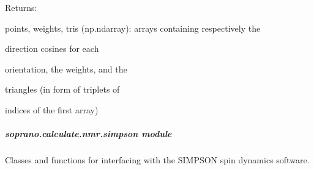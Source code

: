 \documentclass[letterpaper,10pt,english]{sphinxmanual}
\begin{document}
\begin{fulllineitems}
\begin{DUlineblock}{0em}
\item[] Returns:
\item[]
\begin{DUlineblock}{\DUlineblockindent}
\item[] points, weights, tris (np.ndarray): arrays containing respectively the
\item[]
\begin{DUlineblock}{\DUlineblockindent}
\item[] direction cosines for each
\item[] orientation, the weights, and the
\item[] triangles (in form of triplets of
\item[] indices of the first array)
\end{DUlineblock}
\end{DUlineblock}
\end{DUlineblock}

\end{fulllineitems}


\begin{fulllineitems}
\label{doctree/soprano.calculate.nmr.powder:soprano.calculate.nmr.powder.pwd_avg}
\end{fulllineitems}



\subparagraph{soprano.calculate.nmr.simpson module}
\label{doctree/soprano.calculate.nmr.simpson:soprano-calculate-nmr-simpson-module}\label{doctree/soprano.calculate.nmr.simpson::doc}\label{doctree/soprano.calculate.nmr.simpson:module-soprano.calculate.nmr.simpson}
Classes and functions for interfacing with the SIMPSON spin dynamics software.
\end{document}
